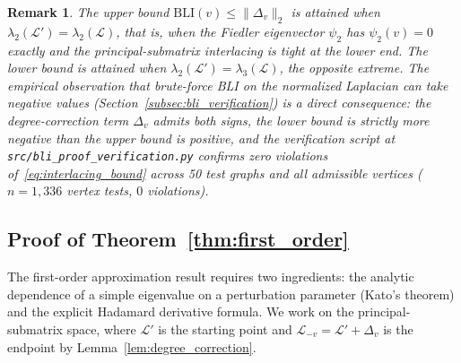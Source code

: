 \documentclass[12pt, a4paper]{article}
\newtheorem*{remark}{Remark}
\begin{document}
\begin{remark}
The upper bound $\mathrm{BLI}(v) \leq \lVert \Delta_v \rVert_2$ is attained when $\lambda_2(\mathcal{L}') = \lambda_2(\mathcal{L})$, that is, when the Fiedler eigenvector $\psi_2$ has $\psi_2(v) = 0$ exactly and the principal-submatrix interlacing is tight at the lower end. The lower bound is attained when $\lambda_2(\mathcal{L}') = \lambda_3(\mathcal{L})$, the opposite extreme. The empirical observation that brute-force BLI on the normalized Laplacian can take negative values (Section~\ref{subsec:bli_verification}) is a direct consequence: the degree-correction term $\Delta_v$ admits both signs, the lower bound is strictly more negative than the upper bound is positive, and the verification script at \texttt{src/bli\_proof\_verification.py} confirms zero violations of~\eqref{eq:interlacing_bound} across 50 test graphs and all admissible vertices ($n = 1{,}336$ vertex tests, $0$ violations).
\end{remark}

\subsection{Proof of Theorem~\ref{thm:first_order}}\label{app:bli_first_order_proof}

The first-order approximation result requires two ingredients: the analytic dependence of a simple eigenvalue on a perturbation parameter (Kato's theorem) and the explicit Hadamard derivative formula. We work on the principal-submatrix space, where $\mathcal{L}'$ is the starting point and $\mathcal{L}_{-v} = \mathcal{L}' + \Delta_v$ is the endpoint by Lemma~\ref{lem:degree_correction}.
\end{document}
